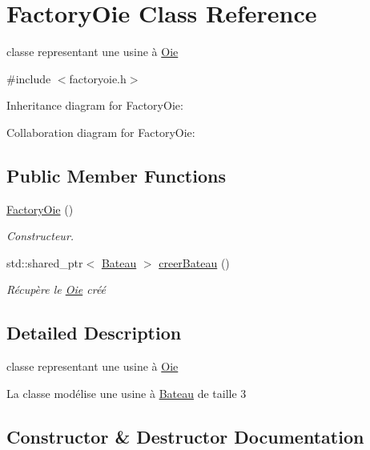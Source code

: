 \hypertarget{class_factory_oie}{}\section{Factory\+Oie Class Reference}
\label{class_factory_oie}


classe representant une usine à \hyperlink{class_oie}{Oie}  




{\ttfamily \#include $<$factoryoie.\+h$>$}



Inheritance diagram for Factory\+Oie\+:


Collaboration diagram for Factory\+Oie\+:
\subsection*{Public Member Functions}
\begin{DoxyCompactItemize}
\item 
\hyperlink{class_factory_oie_a7dee7f5177dd996e37ab8d31d4f5188b}{Factory\+Oie} ()
\begin{DoxyCompactList}\small\item\em Constructeur. \end{DoxyCompactList}\item 
std\+::shared\+\_\+ptr$<$ \hyperlink{class_bateau}{Bateau} $>$ \hyperlink{class_factory_oie_aef35f008954feedb26821fdf5b73328f}{creer\+Bateau} ()
\begin{DoxyCompactList}\small\item\em Récupère le \hyperlink{class_oie}{Oie} créé \end{DoxyCompactList}\end{DoxyCompactItemize}


\subsection{Detailed Description}
classe representant une usine à \hyperlink{class_oie}{Oie} 

La classe modélise une usine à \hyperlink{class_bateau}{Bateau} de taille 3 

\subsection{Constructor \& Destructor Documentation}
